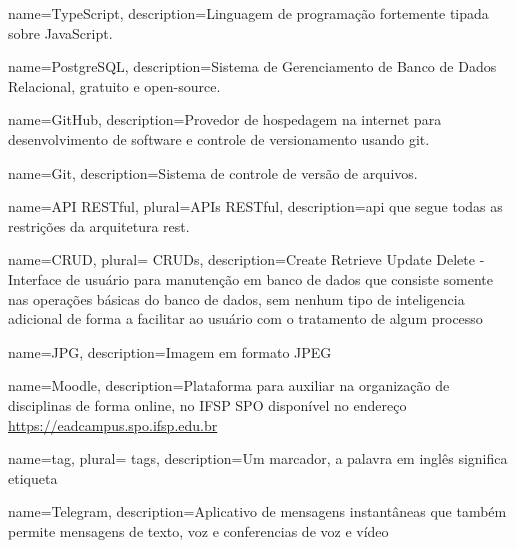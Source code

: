  {
	name=TypeScript,
	description={Linguagem de programação fortemente tipada sobre JavaScript.}
}

 {
	name=PostgreSQL,
	description={Sistema de Gerenciamento de Banco de Dados Relacional, gratuito e open-source.}
}

 {
	name=GitHub,
	description={Provedor de hospedagem na internet para desenvolvimento de software e controle de versionamento usando \gls{git}.}
}

 {
	name=Git,
	description={Sistema de controle de versão de arquivos.}
}

 {
	name=API RESTful,
	plural=APIs RESTful,
	description={\ac{api} que segue todas as restrições da arquitetura \ac{rest}.}
}


 



 {
    name=CRUD,
    plural= {CRUDs},
    description={Create Retrieve Update Delete - Interface de usuário para manutenção em banco de dados que consiste somente nas operações básicas do banco de dados, sem nenhum tipo de inteligencia adicional de forma a facilitar ao usuário com o tratamento de algum processo}
}

 {
    name=JPG,
    description={Imagem em formato JPEG}
}

 {
    name=Moodle,
    description={Plataforma para auxiliar na organização de disciplinas de forma online, no IFSP SPO disponível no endereço \url{https://eadcampus.spo.ifsp.edu.br}}
}


 {
    name=tag,
    plural= {tags},
    description={Um marcador, a palavra em inglês significa etiqueta}
}
                
 {
    name=Telegram,
    description={Aplicativo de mensagens instantâneas que também permite mensagens de texto, voz e conferencias de voz e vídeo}
}
